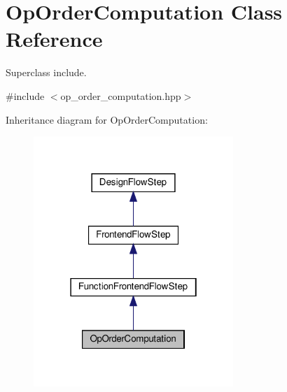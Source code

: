 \hypertarget{classOpOrderComputation}{}\section{Op\+Order\+Computation Class Reference}
\label{classOpOrderComputation}


Superclass include.  




{\ttfamily \#include $<$op\+\_\+order\+\_\+computation.\+hpp$>$}



Inheritance diagram for Op\+Order\+Computation\+:
\nopagebreak
\begin{figure}[H]
\begin{center}
\leavevmode
\includegraphics[width=214pt]{dd/d57/classOpOrderComputation__inherit__graph}
\end{center}
\end{figure}


